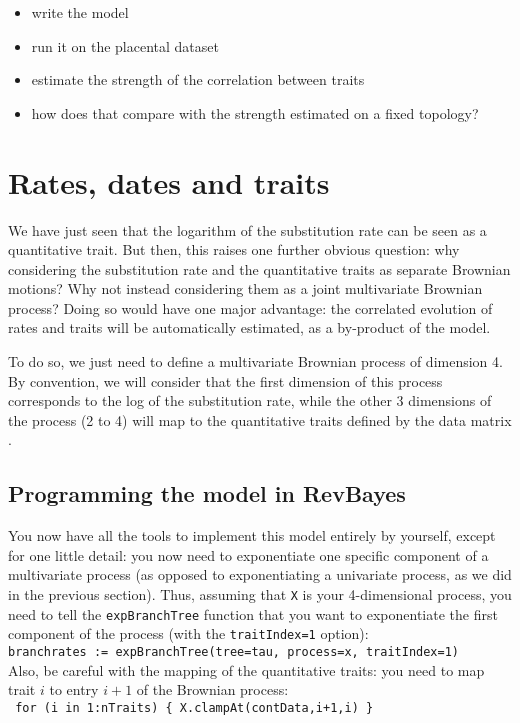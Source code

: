 \documentclass[usletter]{article}
\newcommand{\cmd}[1]{\texttt{#1}}
\begin{document}
\begin{itemize}
\item
write the model
\item
run it on the placental dataset
\item
estimate the strength of the correlation between traits
\item
how does that compare with the strength estimated on a fixed topology?
\end{itemize}

\section{Rates, dates and traits}

We have just seen that the logarithm of the substitution rate can be seen as a quantitative trait. But then, this raises one further obvious question: why considering the substitution rate and the quantitative traits as separate Brownian motions? Why not instead considering them as a joint multivariate Brownian process? Doing so would have one major advantage: the correlated evolution of rates and traits will be automatically estimated, as a by-product of the model.

To do so, we just need to define a multivariate Brownian process of dimension 4.
By convention, we will consider that the first dimension of this process
corresponds to the log of the substitution rate,
while the other 3 dimensions of the process (2 to 4) will map to the quantitative traits defined by the data matrix
\citep{Lartillot:2011p55}.

\subsection*{Programming the model in RevBayes}

You now have all the tools to implement this model entirely by yourself, except for one little detail: you now need to exponentiate one specific component of a multivariate process (as opposed to exponentiating a univariate process, as we did in the previous section). Thus, assuming that \cmd{X} is your 4-dimensional process, you need to tell the \cmd{expBranchTree} function that you want to exponentiate the first component of the process (with the \cmd{traitIndex=1} option):
\\
\cmd{branchrates := expBranchTree(tree=tau, process=x, traitIndex=1)}
\\
Also, be careful with the mapping of the quantitative traits: you need to map trait $i$ to entry $i+1$ of the Brownian process:
\\
\cmd{
for (i in 1:nTraits)    \{
        X.clampAt(contData,i+1,i)
\}
}
\\
\end{document}

